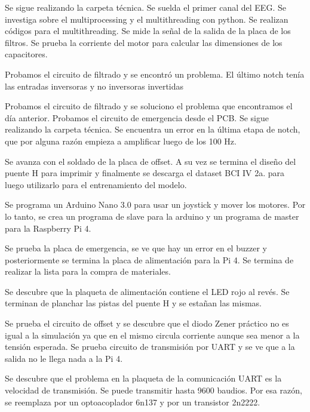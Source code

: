 \documentclass{article}
\begin{document}
Se sigue realizando la carpeta técnica. Se suelda el primer canal del EEG. Se investiga sobre el multiprocessing y el multithreading con python. Se realizan códigos para el multithreading. Se mide la señal de la salida de la placa de los filtros. Se prueba la corriente del motor para calcular las dimensiones de los capacitores.



Probamos el circuito de filtrado y se encontró un problema. El último notch tenía las entradas inversoras y no inversoras invertidas



Probamos el circuito de filtrado y se soluciono el problema que encontramos el día anterior. Probamos el circuito de emergencia desde el PCB. Se sigue realizando la carpeta técnica. Se encuentra un error en la última etapa de notch, que por alguna razón empieza a amplificar luego de los 100 Hz.



Se avanza con el soldado de la placa de offset. A su vez se termina el diseño del puente H para imprimir y finalmente se descarga el dataset BCI IV 2a. para luego utilizarlo para el entrenamiento del modelo.



Se programa un Arduino Nano 3.0 para usar un joystick y mover los motores. Por lo tanto, se crea un programa de slave para la arduino y un programa de master para la Raspberry Pi 4.



Se prueba la placa de emergencia, se ve que hay un error en el buzzer y posteriormente se termina la placa de alimentación para la Pi 4. Se termina de realizar la lista para la compra de materiales.



Se descubre que la plaqueta de alimentación contiene el LED rojo al revés. Se terminan de planchar las pistas del puente H y se estañan las mismas.



Se prueba el circuito de offset y se descubre que el diodo Zener práctico no es igual a la simulación ya que en el mismo circula corriente aunque sea menor a la tensión esperada. Se prueba circuito de transmisión por UART y se ve que a la salida no le llega nada a la Pi 4.



Se descubre que el problema en la plaqueta de la comunicación UART es la velocidad de transmisión. Se puede transmitir hasta 9600 baudios. Por esa razón, se reemplaza por un optoacoplador 6n137 y por un transistor 2n2222.
\end{document}
